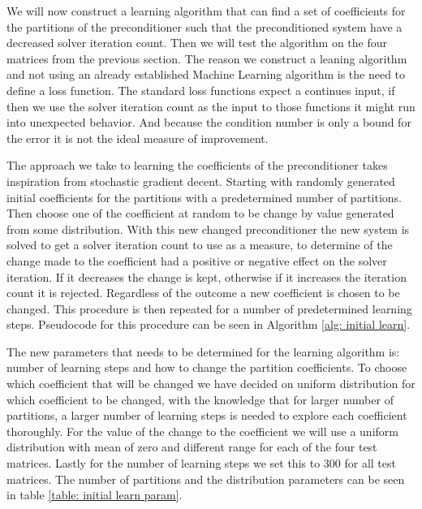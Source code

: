 We will now construct a learning algorithm that can find a set of coefficients for the partitions of the preconditioner such that the preconditioned system have a decreased solver iteration count. Then we will test the algorithm on the four matrices from the previous section. The reason we construct a leaning algorithm and not using an already established Machine Learning algorithm is the need to define a loss function. The standard loss functions expect a continues input, if then we use the solver iteration count as the input to those functions it might run into unexpected behavior. And because the condition number is only a bound for the error it is not the ideal measure of improvement.

The approach we take to learning the coefficients of the preconditioner takes inspiration from stochastic gradient decent. Starting with randomly generated initial coefficients for the partitions with a predetermined number of partitions. Then choose one of the coefficient at random to be change by value generated from some distribution. With this new changed preconditioner the new system is solved to get a solver iteration count to use as a measure, to determine of the change made to the coefficient had a positive or negative effect on the solver iteration. If it decreases the change is kept, otherwise if it increases the iteration count it is rejected. Regardless of the outcome a new coefficient is chosen to be changed. This procedure is then repeated for a number of predetermined learning steps. Pseudocode for this procedure can be seen in Algorithm \ref{alg: initial learn}.

The new parameters that needs to be determined for the learning algorithm is: number of learning steps and how to change the partition coefficients. To choose which coefficient that will be changed we have decided on uniform distribution for which coefficient to be changed, with the knowledge that for larger number of partitions, a larger number of learning steps is needed to explore each coefficient thoroughly. For the value of the change to the coefficient we will use a uniform distribution with mean of zero and different range for each of the four test matrices. Lastly for the number of learning steps we set this to 300 for all test matrices. The number of partitions and the distribution parameters can be seen in table \ref{table: initial learn param}.

